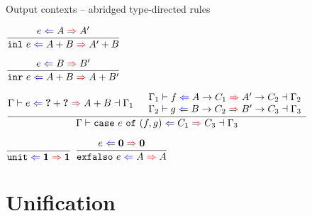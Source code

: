 \documentclass{beamer}
\begin{document}
\begin{frame}{Output contexts -- abridged type-directed rules}

\begin{center}
  $\infrule{\shortoutctx{e}{A}{A'}}{\shortoutctx{\inl{e}}{\Sum{A}{B}}{\Sum{A'}{B}}}$

  \vspace{2em}

  $\infrule{\shortoutctx{e}{B}{B'}}{\shortoutctx{\inr{e}}{\Sum{A}{B}}{\Sum{A}{B'}}}$

  \vspace{2em}

  $\infrule{\fulloutctx{\Gamma}{e}{\Sum{\Hole}{\Hole}}{\Sum{A}{B}}{\Gamma_1} \quad \begin{array}{c} \fulloutctx{\Gamma_1}{f}{\Fun{A}{C_1}}{\Fun{A'}{C_2}}{\Gamma_2} \\ \fulloutctx{\Gamma_2}{g}{\Fun{B}{C_2}}{\Fun{B'}{C_3}}{\Gamma_3} \end{array}}{\fulloutctx{\Gamma}{\case{e}{f}{g}}{C_1}{C_3}{\Gamma_3}}$

  \vspace{2em}

  $\infrule{}{\shortoutctx{\unit}{\Unit}{\Unit}}$
  \quad
  $\infrule{\shortoutctx{e}{\Empty}{\Empty}}{\shortoutctx{\exfalso{e}}{A}{A}}$
\end{center}

\end{frame}

\section{Unification}

\newcommand{\extendunif}[2]{#1, #2}
\newcommand{\extendunifdef}[3]{#1, #2 := #3}

\newcommand{\fulluniftyping}[5]{#1 \vdash #2 \mathcolor{blue}{\Leftarrow} #3 \mathcolor{red}{\Rightarrow} #4 \dashv #5}
\newcommand{\uniftyping}[3]{\fulluniftyping{\Gamma}{#1}{#2}{#3}{\Gamma'}}
\newcommand{\shortuniftyping}[3]{#1 \mathcolor{blue}{\Leftarrow} #2 \mathcolor{red}{\Rightarrow} #3}
\end{document}
